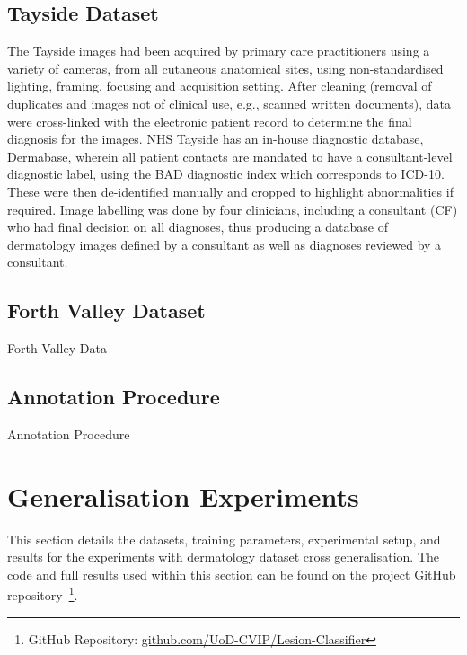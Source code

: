 \subsection{Tayside Dataset}
\label{subsec:tayside_dataset}
The Tayside images had been acquired by primary care practitioners using a variety of cameras, from all cutaneous anatomical sites, using non-standardised lighting, framing, focusing and acquisition setting. After cleaning (removal of duplicates and images not of clinical use, e.g., scanned written documents), data were cross-linked with the electronic patient record to determine the final diagnosis for the images. NHS Tayside has an in-house diagnostic database, Dermabase, wherein all patient contacts are mandated to have a consultant-level diagnostic label, using the BAD diagnostic index which corresponds to ICD-10. These were then de-identified manually and cropped to highlight abnormalities if required. Image labelling was done by four clinicians, including a consultant (CF) who had final decision on all diagnoses, thus producing a database of dermatology images defined by a consultant as well as diagnoses reviewed by a consultant.

\subsection{Forth Valley Dataset}
\label{subsec:forth_valley_dataset}
Forth Valley Data

\subsection{Annotation Procedure}
\label{subsec:annotation_procedure}
Annotation Procedure



\section{Generalisation Experiments}
\label{sec:generalisation_experiments}
This section details the datasets, training parameters, experimental setup, and results for the experiments with dermatology dataset cross generalisation. The code and full results used within this section can be found on the project GitHub repository~\footnote{GitHub Repository: \url{github.com/UoD-CVIP/Lesion-Classifier}}.

